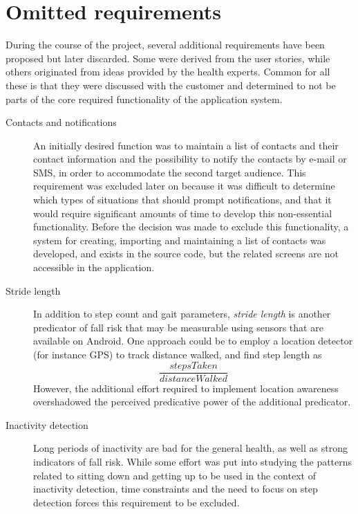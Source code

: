 \section{Omitted requirements} \label{expert_meeting_requirement}
During the course of the project, several additional requirements have been proposed but later discarded. Some were derived from the user stories, while others originated from ideas provided by the health experts. Common for all these is that they were discussed with the customer and determined to not be parts of the core required functionality of the application system.

\begin{description} 
\item[Contacts and notifications] An initially desired function was to maintain a list of contacts and their contact information and the possibility to notify the contacts by e-mail or SMS, in order to accommodate the second target audience. This requirement was excluded later on because it was difficult to determine which types of situations that should prompt notifications, and that it would require significant amounts of time to develop this non-essential functionality. Before the decision was made to exclude this functionality, a system for creating, importing and maintaining a list of contacts was developed, and exists in the source code, but the related screens are not accessible in the application.
\item[Stride length] In addition to step count and gait parameters, \emph{stride length} is another predicator of fall risk that may be measurable using sensors that are available on Android. One approach could be to employ a location detector (for instance GPS) to track distance walked, and find step length as $$\frac{stepsTaken}{distanceWalked}$$However, the additional effort required to implement location awareness overshadowed the perceived predicative power of the additional predicator.
\item[Inactivity detection] Long periods of inactivity are bad for the general health, as well as strong indicators of fall risk. While some effort was put into studying the patterns related to sitting down and getting up to be used in the context of inactivity detection, time constraints and the need to focus on step detection forces this requirement to be excluded. 
\end{description} 


